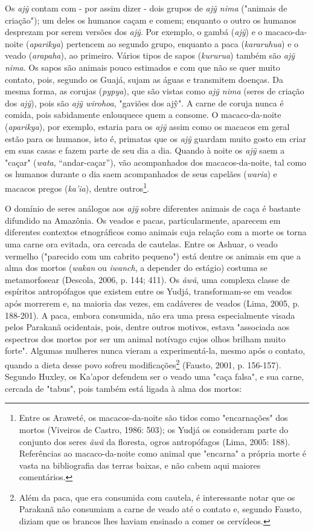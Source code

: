 Os \emph{ajỹ} contam com - por assim dizer - dois grupos de \emph{ajỹ
nima} ("animais de criação"); um deles os humanos caçam e comem;
enquanto o outro os humanos desprezam por serem versões dos \emph{ajỹ}.
Por exemplo, o gambá (\emph{ajỹ}) e o macaco-da-noite (\emph{aparikya})
pertencem ao segundo grupo, enquanto a paca (\emph{kararuhua}) e o veado
(\emph{arapaha}), ao primeiro. Vários tipos de sapos (\emph{kururua})
também são \emph{ajỹ nima}. Os sapos são animais pouco estimados e com
que não se quer muito contato, pois, segundo os Guajá, sujam as águas e
transmitem doenças. Da mesma forma, as corujas (\emph{pypya}), que são
vistas como \emph{ajỹ nima} (seres de criação dos \emph{ajỹ}), pois são
\emph{ajỹ wirohoa}, "gaviões dos ajỹ". A carne de coruja nunca é comida,
pois sabidamente enlouquece quem a consome. O macaco-da-noite
(\emph{aparikya}), por exemplo, estaria para os \emph{ajỹ} assim como os
macacos em geral estão para os humanos, isto é, primatas que os
\emph{ajỹ} guardam muito gosto em criar em suas casas e fazem parte de
seu dia a dia. Quando à noite os \emph{ajỹ} saem a "caçar" (\emph{wata},
``andar-caçar''), vão acompanhados dos macacos-da-noite, tal como os
humanos durante o dia saem acompanhados de seus capelães (\emph{waria})
e macacos pregos (\emph{ka'ia}), dentre outros\footnote{Entre os
  Araweté, os macacos-da-noite são tidos como "encarnações" dos mortos
  (Viveiros de Castro, 1986: 503); os Yudjá os consideram parte do
  conjunto dos seres \emph{ãwã} da floresta, ogros antropófagos (Lima,
  2005: 188). Referências ao macaco-da-noite como animal que "encarna" a
  própria morte é vasta na bibliografia das terras baixas, e não cabem
  aqui maiores comentários.}.

O domínio de seres análogos aos \emph{ajỹ} sobre diferentes animais de
caça é bastante difundido na Amazônia. Os veados e pacas,
particularmente, aparecem em diferentes contextos etnográficos como
animais cuja relação com a morte os torna uma carne ora evitada, ora
cercada de cautelas. Entre os Ashuar, o veado vermelho ("parecido com um
cabrito pequeno") está dentre os animais em que a alma dos mortos
(\emph{wakan} ou \emph{iwanch}, a depender do estágio) costuma se
metamorfosear (Descola, 2006, p. 144; 411). Os \emph{ãwã}, uma complexa
classe de espíritos antropófagos que existem entre os Yudjá,
transformam-se em veados após morrerem e, na maioria das vezes, em
cadáveres de veados (Lima, 2005, p. 188-201). A paca, embora consumida,
não era uma presa especialmente visada pelos Parakanã ocidentais, pois,
dentre outros motivos, estava "associada aos espectros dos mortos por
ser um animal notívago cujos olhos brilham muito forte". Algumas
mulheres nunca vieram a experimentá-la, mesmo após o contato, quando a
dieta desse povo sofreu modificações\footnote{Além da paca, que era
  consumida com cautela, é interessante notar que os Parakanã não
  consumiam a carne de veado até o contato e, segundo Fausto, diziam que
  os brancos lhes haviam ensinado a comer os cervídeos.} (Fausto, 2001,
p. 156-157). Segundo Huxley, os Ka'apor defendem ser o veado uma "caça
falsa", e sua carne, cercada de "tabus", pois também está ligada à alma
dos mortos:

